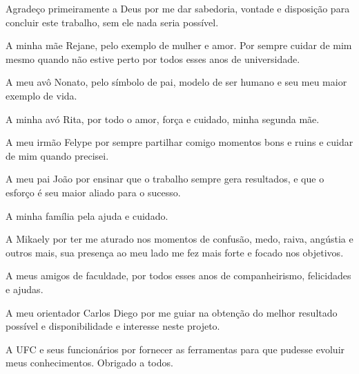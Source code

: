\begin{agradecimentos}
	 Agradeço primeiramente a Deus por me dar sabedoria, vontade e disposição para concluir este trabalho, sem ele nada seria possível.
	 
	 A minha mãe Rejane, pelo exemplo de mulher e amor. Por sempre cuidar de mim mesmo quando não estive perto por todos esses anos de universidade.
	 
	 A meu avô Nonato, pelo símbolo de pai, modelo de ser humano e seu meu maior exemplo de vida.
	 
	 A minha avó Rita, por todo o amor, força e cuidado, minha segunda mãe.
	 
	 A meu irmão Felype por sempre partilhar comigo momentos bons e ruins e cuidar de mim quando precisei.
	 
	 A meu pai João por ensinar que o trabalho sempre gera resultados, e que o esforço é seu maior aliado para o sucesso. 
	 
	 A minha família pela ajuda e cuidado.
	 
	 A Mikaely por ter me aturado nos momentos de confusão, medo, raiva, angústia e outros mais, sua presença ao meu lado me fez mais forte e focado nos objetivos.
	 
	 A meus amigos de faculdade, por todos esses anos de companheirismo, felicidades e ajudas.
	 
	 A meu orientador Carlos Diego por me guiar na obtenção do melhor resultado possível e disponibilidade e interesse neste projeto.
	 
	 A UFC e seus funcionários por fornecer as ferramentas para que pudesse evoluir meus conhecimentos. Obrigado a todos.
\end{agradecimentos}
